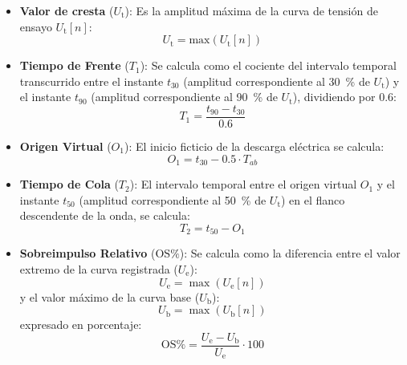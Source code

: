 \begin{enumerate}
    \begin{itemize}
        \item \textbf{Valor de cresta} ($U_\text{t}$): Es la amplitud máxima de la curva de tensión de ensayo $U_\text{t}[n]$:
        \begin{equation}
            \label{eq:valor_cresta}
            U_\text{t} = \text{max}(U_\text{t}[n])
        \end{equation}
        \item \textbf{Tiempo de Frente} ($T_1$): Se calcula como el cociente del intervalo temporal transcurrido entre el instante $t_{30}$ (amplitud correspondiente al \qty{30}{\percent} de $U_\text{t}$) y el instante $t_{90}$ (amplitud correspondiente al \qty{90}{\percent} de $U_\text{t}$), dividiendo por $\num{0.6}$:
        \begin{equation}
            \label{eq:tiempo_frente}
            T_1 = \frac{t_{90} - t_{30}}{\num{0.6}}
        \end{equation}
        \item \textbf{Origen Virtual} ($O_1$): El inicio ficticio de la descarga eléctrica se calcula:
        \begin{equation}
            \label{eq:origen_virtual}
            O_1 = t_{30} - \num{0.5} \cdot T_{ab}
        \end{equation}
        \item \textbf{Tiempo de Cola} ($T_2$): El intervalo temporal entre el origen virtual $O_1$ y el instante $t_{50}$ (amplitud correspondiente al \qty{50}{\percent} de $U_\text{t}$) en el flanco descendente de la onda, se calcula:
        \begin{equation}
            \label{eq:tiempo_cola}
            T_2 = t_{50} - O_1
        \end{equation}
        \item \textbf{Sobreimpulso Relativo} ($\text{OS}\%$): Se calcula como la diferencia entre el valor extremo de la curva registrada ($U_\text{e}$):
        \begin{equation}
            \label{eq:max_curva_registrada}
            U_\text{e} = \max(U_\text{e}[n])
        \end{equation}
        y el valor máximo de la curva base ($U_\text{b}$):
        \begin{equation}
            \label{eq:max_curva_base}
            U_\text{b} = \max(U_\text{b}[n])
        \end{equation}
        expresado en porcentaje:
        \begin{equation}
            \label{eq:sobreimpulso_relativo}
            \text{OS}\% = \frac{U_\text{e} - U_\text{b}}{U_\text{e}} \cdot \num{100}
        \end{equation}
    \end{itemize}
\end{enumerate}